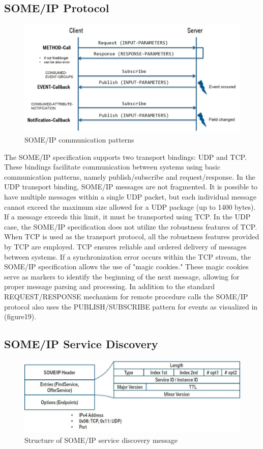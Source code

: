 \documentclass[
12pt,
oneside, 
onehalfspacing, 
nolistspacing, 
parskip, 
chapterinoneline, 
]{AASTCOMPUTER}
\begin{document}
\subsection{SOME/IP Protocol}
\begin{figure}[!ht]
\centering
\includegraphics[scale=0.3]{Figures/19.png}
\caption[SOME/IP communication patterns]{SOME/IP communication patterns}
\label{fig:TCU}
\end{figure}
The SOME/IP specification supports two transport bindings: UDP and TCP. These bindings facilitate communication between systems using basic communication patterns, namely publish/subscribe and request/response. In the UDP transport binding, SOME/IP messages are not fragmented. It is possible to have multiple messages within a single UDP packet, but each individual message cannot exceed the maximum size allowed for a UDP package (up to 1400 bytes). If a message exceeds this limit, it must be transported using TCP. In the UDP case, the SOME/IP specification does not utilize the robustness features of TCP.
When TCP is used as the transport protocol, all the robustness features provided by TCP are employed. TCP ensures reliable and ordered delivery of messages between systems. If a synchronization error occurs within the TCP stream, the SOME/IP specification allows the use of "magic cookies." These magic cookies serve as markers to identify the beginning of the next message, allowing for proper message parsing and processing.
In addition to the standard REQUEST/RESPONSE mechanism for remote procedure calls the SOME/IP protocol also uses the PUBLISH/SUBSCRIBE pattern for events as visualized in (figure19).
\subsection{SOME/IP Service Discovery}
\begin{figure}[!ht]
\centering
\includegraphics[scale=0.3]{Figures/20.png}
\caption[Structure of SOME/IP service discovery message]{Structure of SOME/IP service discovery message}
\label{fig:TCU}
\end{figure}
\end{document}
